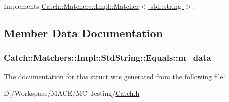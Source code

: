 Implements \hyperlink{struct_catch_1_1_matchers_1_1_impl_1_1_matcher_afd2469dc5c1869d67d4ad00d3b6388eb}{Catch\+::\+Matchers\+::\+Impl\+::\+Matcher$<$ std\+::string $>$}.



\subsection{Member Data Documentation}
\subsubsection[{\texorpdfstring{m\+\_\+data}{m_data}}]{ Catch\+::\+Matchers\+::\+Impl\+::\+Std\+String\+::\+Equals\+::m\+\_\+data}\hypertarget{struct_catch_1_1_matchers_1_1_impl_1_1_std_string_1_1_equals_ae09964b7ba291ce574b514a2ee3eddb0}{}\label{struct_catch_1_1_matchers_1_1_impl_1_1_std_string_1_1_equals_ae09964b7ba291ce574b514a2ee3eddb0}


The documentation for this struct was generated from the following file\+:\begin{DoxyCompactItemize}
\item 
D\+:/\+Workspace/\+M\+A\+C\+E/\+M\+C-\/\+Testing/\hyperlink{_catch_8h}{Catch.\+h}\end{DoxyCompactItemize}
